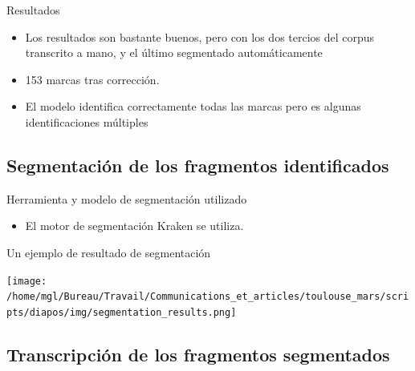 \documentclass[11pt,aspectratio=169]{beamer}
\begin{document}
\begin{frame}{Resultados}
\begin{itemize}
\item Los resultados son bastante buenos, pero con los dos tercios del corpus transcrito a mano, y el último segmentado automáticamente
\item 153 marcas tras corrección. 
\item El modelo identifica correctamente todas las marcas pero es algunas identificaciones múltiples
\end{itemize}
\end{frame}


\subsection{Segmentación de los fragmentos identificados}

\begin{frame}{Herramienta y modelo de segmentación utilizado}
\begin{itemize}
\item El motor de segmentación Kraken \parencite{kiessling_KrakenUniversalText_2019} se utiliza. 
\end{itemize}
\end{frame}

\begin{frame}{Un ejemplo de resultado de segmentación}
\begin{center}
\texttt{[image: /home/mgl/Bureau/Travail/Communications\_et\_articles/toulouse\_mars/scripts/diapos/img/segmentation\_results.png]}
\end{center}
\end{frame}


\subsection{Transcripción de los fragmentos segmentados}
\end{document}
